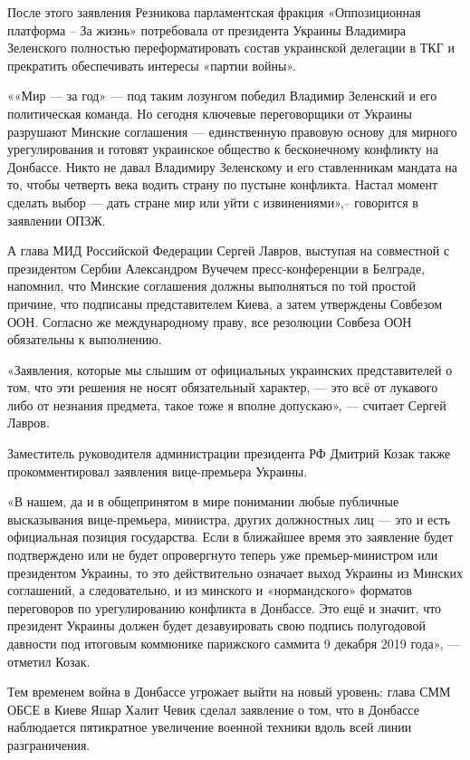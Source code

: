 \documentclass[a4paper,11pt]{extreport}
\begin{document}
После этого заявления Резникова парламентская фракция «Оппозиционная платформа
– За жизнь» потребовала от президента Украины Владимира Зеленского полностью
переформатировать состав украинской делегации в ТКГ и прекратить обеспечивать
интересы «партии войны».

««Мир --- за год» --- под таким лозунгом победил Владимир Зеленский и его
политическая команда. Но сегодня ключевые переговорщики от Украины разрушают
Минские соглашения --- единственную правовую основу для мирного урегулирования и
готовят украинское общество к бесконечному конфликту на Донбассе. Никто не
давал Владимиру Зеленскому и его ставленникам мандата на то, чтобы четверть
века водить страну по пустыне конфликта. Настал момент сделать выбор --- дать
стране мир или уйти с извинениями»,– говорится в заявлении ОПЗЖ.

А глава МИД Российской Федерации Сергей Лавров, выступая на совместной с
президентом Сербии Александром Вучечем пресс-конференции в Белграде, напомнил,
что Минские соглашения должны выполняться по той простой причине, что подписаны
представителем Киева, а затем утверждены Совбезом ООН. Согласно же
международному праву, все резолюции Совбеза ООН обязательны к выполнению.

«Заявления, которые мы слышим от официальных украинских представителей о том,
что эти решения не носят обязательный характер, --- это всё от лукавого либо от
незнания предмета, такое тоже я вполне допускаю», --- считает Сергей Лавров.

Заместитель руководителя администрации президента РФ Дмитрий Козак также
прокомментировал заявления вице-премьера Украины.

«В нашем, да и в общепринятом в мире понимании любые публичные высказывания
вице-премьера, министра, других должностных лиц --- это и есть официальная
позиция государства. Если в ближайшее время это заявление будет подтверждено
или не будет опровергнуто теперь уже премьер-министром или президентом Украины,
то это действительно означает выход Украины из Минских соглашений, а
следовательно, и из минского и «нормандского» форматов переговоров по
урегулированию конфликта в Донбассе. Это ещё и значит, что президент Украины
должен будет дезавуировать свою подпись полугодовой давности под итоговым
коммюнике парижского саммита 9 декабря 2019 года», --- отметил Козак.

Тем временем война в Донбассе угрожает выйти на новый уровень: глава СММ ОБСЕ в
Киеве Яшар Халит Чевик сделал заявление о том, что в Донбассе наблюдается
пятикратное увеличение военной техники вдоль всей линии разграничения.
\end{document}
